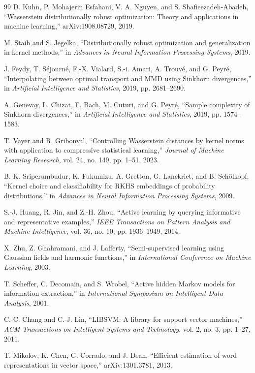 \documentclass[10pt,journal]{IEEEtran}
\begin{document}
\begin{thebibliography}{99}
D. Kuhn, P. Mohajerin Esfahani, V. A. Nguyen, and S. Shafieezadeh-Abadeh, ``Wasserstein distributionally robust optimization: Theory and applications in machine learning,'' arXiv:1908.08729, 2019.

M. Staib and S. Jegelka, ``Distributionally robust optimization and generalization in kernel methods,'' in \emph{Advances in Neural Information Processing Systems}, 2019.

J. Feydy, T. S{\'e}journ{\'e}, F.-X. Vialard, S.-i. Amari, A. Trouv{\'e}, and G. Peyr{\'e}, ``Interpolating between optimal transport and MMD using Sinkhorn divergences,'' in \emph{Artificial Intelligence and Statistics}, 2019, pp. 2681--2690.

A. Genevay, L. Chizat, F. Bach, M. Cuturi, and G. Peyr{\'e}, ``Sample complexity of Sinkhorn divergences,'' in \emph{Artificial Intelligence and Statistics}, 2019, pp. 1574--1583.

T. Vayer and R. Gribonval, ``Controlling Wasserstein distances by kernel norms with application to compressive statistical learning,'' \emph{Journal of Machine Learning Research}, vol. 24, no. 149, pp. 1--51, 2023.

B. K. Sriperumbudur, K. Fukumizu, A. Gretton, G. Lanckriet, and B. Sch{\"o}lkopf, ``Kernel choice and classifiability for RKHS embeddings of probability distributions,'' in \emph{Advances in Neural Information Processing Systems}, 2009.

S.-J. Huang, R. Jin, and Z.-H. Zhou, ``Active learning by querying informative and representative examples,'' \emph{IEEE Transactions on Pattern Analysis and Machine Intelligence}, vol. 36, no. 10, pp. 1936--1949, 2014.

X. Zhu, Z. Ghahramani, and J. Lafferty, ``Semi-supervised learning using Gaussian fields and harmonic functions,'' in \emph{International Conference on Machine Learning}, 2003.

T. Scheffer, C. Decomain, and S. Wrobel, ``Active hidden Markov models for information extraction,'' in \emph{International Symposium on Intelligent Data Analysis}, 2001.

C.-C. Chang and C.-J. Lin, ``LIBSVM: A library for support vector machines,'' \emph{ACM Transactions on Intelligent Systems and Technology}, vol. 2, no. 3, pp. 1--27, 2011.

T. Mikolov, K. Chen, G. Corrado, and J. Dean, ``Efficient estimation of word representations in vector space,'' arXiv:1301.3781, 2013.

\end{thebibliography}
\end{document}
